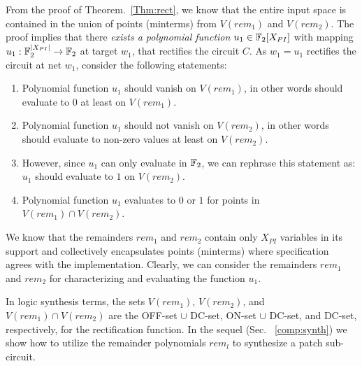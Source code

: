 From the proof of Theorem.~\ref{Thm:rect}, we know that the entire input space is contained in the 
union of points (minterms) from $V(rem_1)$ and $V(rem_2)$. The proof implies that there {\it exists a
polynomial function} $u_1\in {\mathbb{F}}_2[X_{PI}]$ with mapping $u_1:{\mathbb{F}}_{2}^{|X_{PI}|}\rightarrow {\mathbb{F}}_{2}$ 
at target $w_1$, that rectifies the circuit $C$.  
As $w_1 = u_1$ rectifies the circuit at net $w_1$, consider the following statements: 

\begin{enumerate}
  \item Polynomial function $u_1$ should vanish on $V(rem_1)$, in other words should evaluate 
  to $0$ at least on $V(rem_1)$.
  \item Polynomial function $u_1$ should not vanish on $V(rem_2)$, in other words should evaluate 
  to non-zero values at least on $V(rem_2)$.
  \bi
    \item However, since $u_1$ can only evaluate in ${\mathbb{F}}_2$, we can rephrase this statement as:
    $u_1$ should evaluate to $1$ on $V(rem_2)$. 
  \ei
  \item Polynomial function $u_1$ evaluates to $0$ or $1$ for points in $V(rem_1) \cap V(rem_2)$.
\end{enumerate}

We know that the remainders $rem_1$ and $rem_2$ contain 
only $X_{PI}$ variables in its support and collectively encapsulates points (minterms) where 
specification agrees with the implementation. Clearly, we can consider the remainders $rem_1$
and $rem_2$ for characterizing and evaluating the function $u_1$. 

In logic synthesis terms, the sets $V(rem_1)$, $V(rem_2)$, and
$V(rem_1) \cap V(rem_2)$ are the OFF-set $\cup$ DC-set, ON-set $\cup$ DC-set, and DC-set, respectively, for the
rectification function. In the sequel (Sec. ~\ref{comp:synth}) we show how to utilize the
remainder polynomials $rem_l$ to synthesize a patch sub-circuit. 


